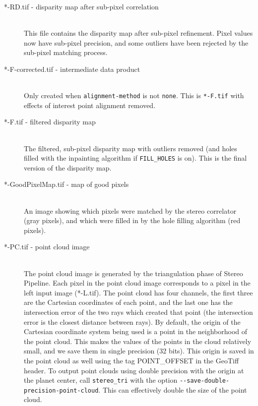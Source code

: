 \begin{description}
\item[*-RD.tif - \textnormal{disparity map after sub-pixel correlation}] \hfill \\
  This file contains the disparity map after sub-pixel refinement.
  Pixel values now have sub-pixel precision, and some outliers have
  been rejected by the sub-pixel matching process.

\item[*-F-corrected.tif \textnormal{- intermediate data product}] \hfill \\
  Only created when \texttt{alignment-method} is not \texttt{none}.
  This is \texttt{*-F.tif} with effects of interest point alignment removed.

\item[*-F.tif \textnormal{- filtered disparity map}] \hfill \\
  The filtered, sub-pixel disparity map with outliers removed (and
  holes filled with the inpainting algorithm if \texttt{FILL\_HOLES}
  is on). This is the final version of the disparity map.

\item[*-GoodPixelMap.tif \textnormal{- map of good pixels}] \hfill \\
  An image showing which pixels were matched by the stereo correlator
  (gray pixels), and which were filled in by the hole filling
  algorithm (red pixels).

\item[*-PC.tif \textnormal{- point cloud image}] \hfill \\ The point
cloud image is generated by the triangulation phase of Stereo Pipeline.
Each pixel in the point cloud image corresponds to a pixel in the left
input image (*-L.tif). The point cloud has four channels, the first
three are the Cartesian coordinates of each point, and the last one has
the intersection error of the two rays which created that point (the
intersection error is the closest distance between rays).  By default,
the origin of the Cartesian coordinate system being used is a point in
the neighborhood of the point cloud. This makes the values of the points
in the cloud relatively small, and we save them in single precision (32
bits). This origin is saved in the point cloud as well using the tag
POINT\_OFFSET in the GeoTiff header. To output point clouds using double
precision with the origin at the planet center, call {\tt stereo\_tri}
with the option {\tt -\/-save-double-precision-point-cloud}. This can
effectively double the size of the point cloud.


\end{description}
